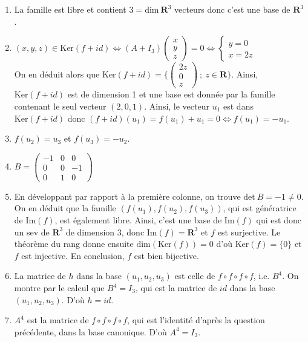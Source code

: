 \documentclass[10pt,a4paper,french]{article}
\begin{document}
\begin{enumerate}
	\item La famille est libre et contient $3 = \text{dim} \ \mathbf{R}^3$ vecteurs donc c'est une base de $\mathbf{R}^3$.
	
	\item $(x,y,z) \in \text{Ker}(f+id) \Longleftrightarrow (A+I_3) \begin{pmatrix}
	x \\
	y \\
	z
	\end{pmatrix} = 0 \Longleftrightarrow \left\{
	\begin{array}{l}
	y = 0 \\
	x = 2z
	\end{array}
	\right.$ \\
	On en déduit alors que $\text{Ker}(f+id) = \{ \begin{pmatrix}
	2z \\
	0 \\
	z
	\end{pmatrix} \ ; \ z \in \mathbf{R}
	\}$. Ainsi, $\text{Ker}(f+id)$ est de dimension 1 et une base est donnée par la famille contenant le seul vecteur $(2,0,1)$. Ainsi, le vecteur $u_1$ est dans $\text{Ker}(f+id)$  donc $(f+id)(u_1) = f(u_1) + u_1 = 0 \Longleftrightarrow f(u_1) = -u_1$.
	
	\item $f(u_2) = u_3$ et $f(u_3) = -u_2$.
	
	\item $B = \begin{pmatrix}
	-1 & 0 & 0 \\
	0 & 0 & -1 \\
	0 & 1 & 0
	\end{pmatrix}$
	
	\item En développant par rapport à la première colonne, on trouve $\text{det} \ B = -1 \neq 0$. On en déduit que la famille $(f(u_1), f(u_2), f(u_3))$, qui est génératrice de $\text{Im}(f)$, est également libre. Ainsi, c'est une base de $\text{Im}(f)$ qui est donc un sev de $\mathbf{R}^3$ de dimension 3, donc $\text{Im}(f) = \mathbf{R}^3$ et $f$ est surjective. Le théorème du rang donne ensuite $\text{dim}(\text{Ker}(f)) = 0$ d'où $\text{Ker}(f) = \{0\}$ et $f$ est injective. En conclusion, $f$ est bien bijective.
	
	\item La matrice de $h$ dans la base $(u_1, u_2, u_3)$ est celle de $f \circ f \circ f \circ f$, i.e. $B^4$. On montre par le calcul que $B^4 = I_3$, qui est la matrice de $id$ dans la base $(u_1, u_2, u_3)$. D'où $h = id$.
	
	\item $A^4$ est la matrice de $f \circ f \circ f \circ f$, qui est l'identité d'après la question précédente, dans la base canonique. D'où $A^4 = I_3$. 
\end{enumerate}
\end{document}
